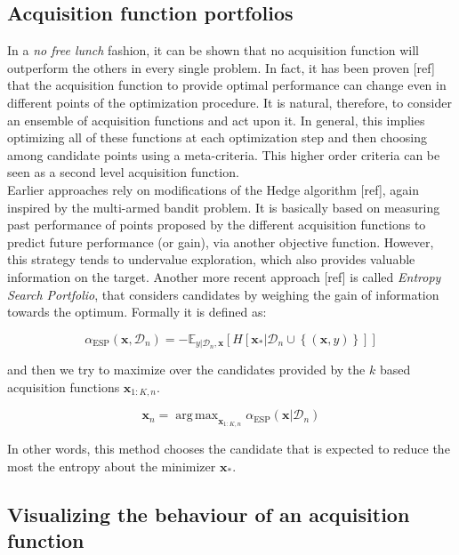 \documentclass[10pt,a4paper,twoside]{book}
\DeclareMathOperator*{\argmax}{arg\,max}
\begin{document}
\subsection{Acquisition function portfolios}

In a \textit{no free lunch} fashion, it can be shown that no acquisition function will outperform the others in every single problem. In fact, it has been proven [ref] that the acquisition function to provide optimal performance can change even in different points of the optimization procedure. It is natural, therefore, to consider an ensemble of acquisition functions and act upon it. In general, this implies optimizing all of these functions at each optimization step and then choosing among candidate points using a meta-criteria. This higher order criteria can be seen as a second level acquisition function.\\

Earlier approaches rely on modifications of the Hedge algorithm [ref], again inspired by the multi-armed bandit problem. It is basically based on measuring past performance of points proposed by the different acquisition functions to predict future performance (or gain), via another objective function. However, this strategy tends to undervalue exploration, which also provides valuable information on the target. Another more recent approach [ref] is called \textit{Entropy Search Portfolio}, that considers candidates by weighing the gain of information towards the optimum. Formally it is defined as:

\begin{equation}
\alpha_{\mathrm{ESP}}(\boldsymbol{x}, \mathcal{D}_n) = - \mathbb{E}_{y|\mathcal{D}_n, \boldsymbol{x}}\left[ H \left[\boldsymbol{x}_* |\mathcal{D}_n \cup \left\lbrace  (\boldsymbol{x},y)\right\rbrace \right] \right]
\end{equation} 

and then we try to maximize over the candidates provided by the $k$ based acquisition functions $\boldsymbol{x}_{1:K, n}$.

\begin{equation}
\boldsymbol{x}_n = \argmax_{\boldsymbol{x}_{1:K, n}} \alpha_{\mathrm{ESP}}(\boldsymbol{x}|\mathcal{D}_n)
\end{equation}

In other words, this method chooses the candidate that is expected to reduce the most the entropy about the minimizer $\boldsymbol{x}_*$. 

\subsection{Visualizing the behaviour of an acquisition function}
\end{document}
